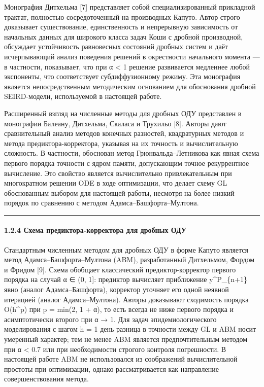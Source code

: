 \documentclass[12pt]{article}
\begin{document}
Монография Дитхельма {[}7{]} представляет собой специализированный
прикладной трактат, полностью сосредоточенный на производных Капуто.
Автор строго доказывает существование, единственность и непрерывную
зависимость от начальных данных для широкого класса задач Коши с дробной
производной, обсуждает устойчивость равновесных состояний дробных систем
и даёт исчерпывающий анализ поведения решений в окрестности начального
момента --- в частности, показывает, что при α \textless{} 1 решение
развивается медленнее любой экспоненты, что соответствует
субдиффузионному режиму. Эта монография является непосредственным
методическим основанием для обоснования дробной SEIRD-модели,
используемой в настоящей работе.

Расширенный взгляд на численные методы для дробных ОДУ представлен в
монографии Балеану, Дитхельма, Скаласа и Трухильо {[}8{]}. Авторы дают
сравнительный анализ методов конечных разностей, квадратурных методов и
метода предиктора-корректора, указывая на их точность и вычислительную
сложность. В частности, обоснован метод Грюнвальда--Летникова как явная
схема первого порядка точности с ядром памяти, допускающим точное
рекуррентное вычисление. Это свойство является вычислительно
привлекательным при многократном решении ODE в ходе оптимизации, что
делает схему GL обоснованным выбором для настоящей работы, несмотря на
более низкий порядок по сравнению с методом Адамса--Башфорта--Мултона.

\begin{center}\rule{0.5\linewidth}{0.5pt}\end{center}

\paragraph{1.2.4 Схема предиктора-корректора для дробных
ОДУ}\label{ux441ux445ux435ux43cux430-ux43fux440ux435ux434ux438ux43aux442ux43eux440ux430-ux43aux43eux440ux440ux435ux43aux442ux43eux440ux430-ux434ux43bux44f-ux434ux440ux43eux431ux43dux44bux445-ux43eux434ux443}

Стандартным численным методом для дробных ОДУ в форме Капуто является
метод Адамса--Башфорта--Мултона (ABM), разработанный Дитхельмом, Фордом
и Фридом {[}9{]}. Схема обобщает классический предиктор-корректор
первого порядка на случай α ∈ (0, 1{]}: предиктор вычисляет приближение
y\^{}P\_\{n+1\} явно (аналог Адамса--Башфорта), корректор уточняет его
одной неявной итерацией (аналог Адамса--Мултона). Авторы доказывают
сходимость порядка O(h\^{}p) при p = min(2, 1 + α), то есть всегда не
ниже первого порядка и асимптотически второго при α → 1. Для задач
эпидемиологического моделирования с шагом h = 1 день разница в точности
между GL и ABM носит умеренный характер; тем не менее ABM является
предпочтительным методом при α \textless{} 0.7 или при необходимости
строгого контроля погрешности. В настоящей работе ABM не использовался
из соображений вычислительной простоты при оптимизации, однако
рассматривается как направление совершенствования метода.
\end{document}
